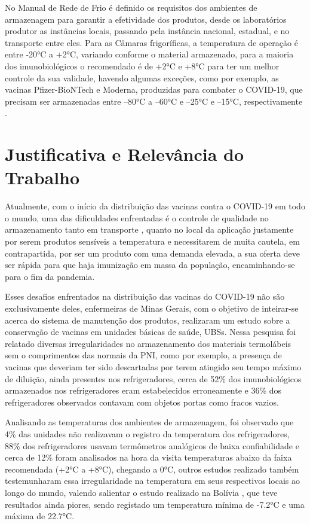 No Manual de Rede de Frio \cite{ministerio2001manual} é definido os requisitos dos ambientes de armazenagem para garantir a efetividade dos produtos, desde os laboratórios produtor as instâncias locais, passando pela instância nacional, estadual, e no transporte entre eles. Para as  Câmaras frigoríficas, a temperatura de operação é entre -20°C a +2°C, variando conforme o material armazenado, para a maioria dos imunobiológicos o recomendado é de +2°C e +8°C para ter um melhor controle da sua validade, havendo algumas exceções, como por exemplo, as vacinas Pfizer-BioNTech e Moderna,  produzidas para combater o COVID-19, que precisam ser armazenadas entre –80°C a –60°C e –25°C e –15°C, respectivamente \cite{niforatoscommon}.

\section{Justificativa e Relevância do Trabalho}
\label{intro:justificativa}
Atualmente, com o início da distribuição das vacinas contra o COVID-19 em todo o mundo, uma das dificuldades enfrentadas é o controle de qualidade no armazenamento tanto em transporte \cite{baechallenges}, quanto no local da aplicação justamente por serem produtos sensíveis a temperatura e necessitarem de muita cautela, em contrapartida, por ser um produto com uma demanda elevada, a sua oferta deve ser rápida para que haja imunização em massa da população, encaminhando-se para o fim da pandemia.

Esses desafios enfrentados na distribuição das vacinas do COVID-19 não são exclusivamente deles, enfermeiras de Minas Gerais, com o objetivo de inteirar-se acerca do sistema de manutenção dos produtos, realizaram um estudo sobre a conservação de vacinas em unidades básicas de saúde, UBSs. Nessa pesquisa foi relatado diversas irregularidades no armazenamento dos materiais termolábeis sem o comprimentos das normais da PNI, como por exemplo, a presença de vacinas que deveriam ter sido descartadas por terem atingido seu tempo máximo de diluição, ainda presentes nos refrigeradores, cerca de 52\% dos imunobiológicos armazenados nos refrigeradores eram estabelecidos erroneamente e 36\% dos refrigeradores observados contavam com objetos portas como fracos vazios.

Analisando as temperaturas dos ambientes de armazenagem, foi observado que 4\% das unidades não realizavam o registro da temperatura dos refrigeradores, 88\% dos refrigeradores usavam termômetros analógicos de baixa confiabilidade e cerca de 12\% foram analisados na hora da visita temperaturas abaixo da faixa recomendada (+2°C a +8°C), chegando a 0°C, outros estudos realizado \cite{oliveira2014avaliaccao, nelson2007monitoring, falcon2020vaccine} também testemunharam essa irregularidade na temperatura em seus respectivos locais ao longo do mundo, valendo salientar o estudo realizado na Bolívia \cite{nelson2007monitoring}, que teve resultados ainda piores, sendo registado um temperatura mínima de -7.2°C e uma máxima de 22.7°C.

